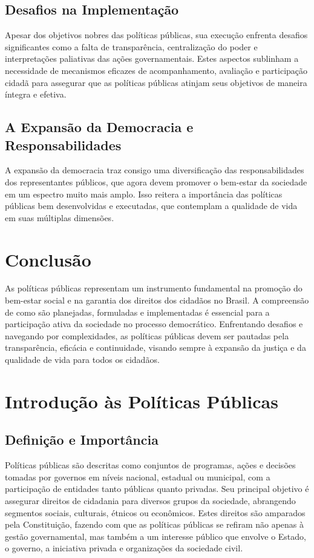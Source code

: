 \documentclass[
   article,       
   12pt,          
   oneside,       
   a4paper,       
   english,       
   brazil,        
   sumario=tradicional
   ]{abntex2}
\begin{document}
\subsection{Desafios na Implementação}
Apesar dos objetivos nobres das políticas públicas, sua execução enfrenta desafios significantes como a falta de transparência, centralização do poder e interpretações paliativas das ações governamentais. Estes aspectos sublinham a necessidade de mecanismos eficazes de acompanhamento, avaliação e participação cidadã para assegurar que as políticas públicas atinjam seus objetivos de maneira íntegra e efetiva.

\subsection{A Expansão da Democracia e Responsabilidades}
A expansão da democracia traz consigo uma diversificação das responsabilidades dos representantes públicos, que agora devem promover o bem-estar da sociedade em um espectro muito mais amplo. Isso reitera a importância das políticas públicas bem desenvolvidas e executadas, que contemplam a qualidade de vida em suas múltiplas dimensões. 

\section{Conclusão}
As políticas públicas representam um instrumento fundamental na promoção do bem-estar social e na garantia dos direitos dos cidadãos no Brasil. A compreensão de como são planejadas, formuladas e implementadas é essencial para a participação ativa da sociedade no processo democrático. Enfrentando desafios e navegando por complexidades, as políticas públicas devem ser pautadas pela transparência, eficácia e continuidade, visando sempre à expansão da justiça e da qualidade de vida para todos os cidadãos.
\section{Introdução às Políticas Públicas}
\subsection{Definição e Importância}
Políticas públicas são descritas como conjuntos de programas, ações e decisões tomadas por governos em níveis nacional, estadual ou municipal, com a participação de entidades tanto públicas quanto privadas. Seu principal objetivo é assegurar direitos de cidadania para diversos grupos da sociedade, abrangendo segmentos sociais, culturais, étnicos ou econômicos. Estes direitos são amparados pela Constituição, fazendo com que as políticas públicas se refiram não apenas à gestão governamental, mas também a um interesse público que envolve o Estado, o governo, a iniciativa privada e organizações da sociedade civil.
\end{document}
